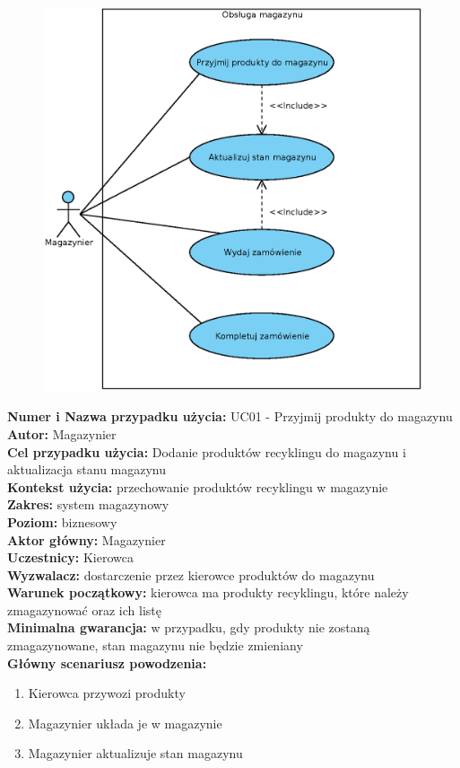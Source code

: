 
\begin{figure}[H]
	\centering
	\includegraphics[width=.8\textwidth]{img/UC/magazyn.eps}
\end{figure}

\textbf{Numer i Nazwa przypadku użycia:} UC01 - Przyjmij produkty do magazynu \\
\textbf{Autor:} Magazynier\\
\textbf{Cel przypadku użycia:} Dodanie produktów recyklingu do magazynu i aktualizacja stanu magazynu \\
\textbf{Kontekst użycia:} przechowanie produktów recyklingu w magazynie\\
\textbf{Zakres:} system magazynowy \\
\textbf{Poziom:} biznesowy \\
\textbf{Aktor główny:} Magazynier \\
\textbf{Uczestnicy:} Kierowca \\
\textbf{Wyzwalacz:} dostarczenie przez kierowce produktów do magazynu \\
\textbf{Warunek początkowy:} kierowca ma produkty recyklingu, które należy zmagazynować oraz ich listę \\
\textbf{Minimalna gwarancja:} w przypadku, gdy produkty nie zostaną zmagazynowane, stan magazynu nie będzie zmieniany \\
\textbf{Główny scenariusz powodzenia:} \\
	\begin{enumerate}
		\item Kierowca przywozi produkty
		\item Magazynier układa je w magazynie
		\item Magazynier aktualizuje stan magazynu
	\end{enumerate}

